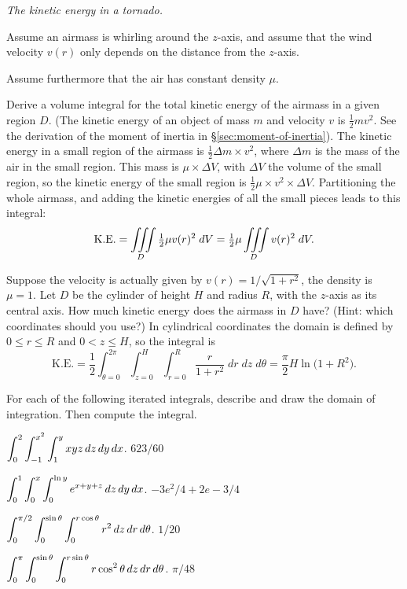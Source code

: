 \begin{multicols}{2}
\problem \textit{The kinetic energy in a tornado.} 

Assume an airmass is whirling around the $z$-axis, and assume that
the wind velocity $v(r)$ only depends on the distance from the $z$-axis.

Assume furthermore that the air has constant density $\mu$.

\subprob Derive a volume integral for the total kinetic energy 
of the airmass in a given region $D$.  (The kinetic energy of an
object of mass $m$ and velocity $v$ is $\frac12 mv^2$.  See the
derivation of the moment of inertia in \S\ref{sec:moment-of-inertia}).
\answer
The kinetic energy in a small region of the airmass is $\frac12 \Delta
m \times v^2$, where $\Delta m$ is the mass of the air in the small
region.  This mass is $\mu\times \Delta V$, with $\Delta V$ the
volume of the small region, so the kinetic energy of the small region
is $\frac 12 \mu \times v^2\times\Delta V$.  Partitioning the
whole airmass, and adding the kinetic energies of all the small pieces
leads to this integral:
\[
\text{K.E.} = \iiint\limits_D \tfrac12\mu v(r)^2\; dV
= \tfrac12\mu \iiint\limits_D v(r)^2\; dV
.\]
\endanswer

\subprob Suppose the velocity is actually given by 
$v(r) = 1/\sqrt{1+r^2}$, the density is $\mu = 1$.  Let $D$ be the
cylinder of height $H$ and radius $R$, with the $z$-axis as its
central axis. How much kinetic energy does the airmass in $D$ have?
(Hint: which coordinates should you use?)
\answer
In cylindrical coordinates the domain is defined by $0\le r\le R$ and
$0< z \le H$, so the integral is
\[
\text{K.E.}
=
\frac 12
\int_{\theta=0}^{2\pi}\int_{z=0}^{H}\int_{r=0}^R
\frac{r}{1+r^2}\; dr\; dz\; d\theta
=
\frac{\pi}{2}H\ln\bigl(1+R^2\bigr).
\]
\endanswer

\problem For each of the following iterated integrals, 
describe and draw the domain of integration.  Then compute the
integral.

\subprob$\displaystyle\int_{0}^{2}\int_{-1}^{x^2}\int_{1}^{y} 
xyz \,dz\,dy\,dx$.
\answer
$623/60$
\endanswer

\subprob$\displaystyle\int_{0}^{1}\int_{0}^{x}\int_{0}^{\ln y} 
e^{x+y+z}\,dz\,dy\,dx$.
\answer
$-3e^2/4+2e-3/4$
\endanswer

\subprob
$\displaystyle\int_{0}^{\pi/2}\int_{0}^{\sin\theta}\int_{0}^{r\cos\theta}
r^2\,dz\,dr\,d\theta$.
\answer
$1/20$
\endanswer

\subprob 
$\displaystyle\int_{0}^{\pi}\int_{0}^{\sin\theta}\int_{0}^{r\sin\theta}
r\cos^2\theta\,dz\,dr\,d\theta$.
\answer
$\pi/48$
\endanswer


\end{multicols}
